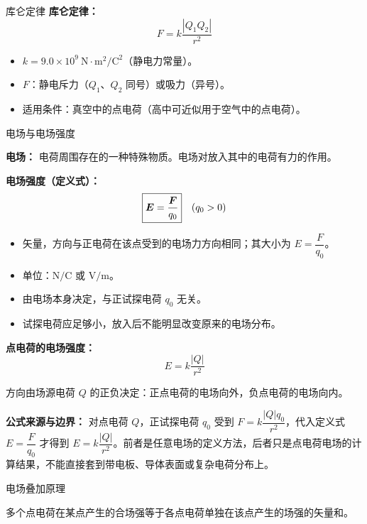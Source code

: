 \begin{conceptbox}{库仑定律}
\textbf{库仑定律：}
\[
\boxed{F = k\frac{|Q_1 Q_2|}{r^2}}
\]

\begin{itemize}
  \item $k = 9.0 \times 10^9\ \mathrm{N \cdot m^2 / C^2}$（静电力常量）。
  \item $F$：静电斥力（$Q_1$、$Q_2$ 同号）或吸力（异号）。
  \item 适用条件：真空中的点电荷（高中可近似用于空气中的点电荷）。
\end{itemize}

\begin{center}


\label{fig:coulomb-law}
\end{center}

\end{conceptbox}

\begin{conceptbox}{电场与电场强度}

\textbf{电场：} 电荷周围存在的一种特殊物质。电场对放入其中的电荷有力的作用。

\textbf{电场强度（定义式）：}
\[
\boxed{\boldsymbol{E} = \frac{\boldsymbol{F}}{q_0}}\quad(q_0>0)
\]

\begin{itemize}
  \item 矢量，方向与正电荷在该点受到的电场力方向相同；其大小为 $E=\dfrac{F}{q_0}$。
  \item 单位：$\mathrm{N/C}$ 或 $\mathrm{V/m}$。
  \item 由电场本身决定，与正试探电荷 $q_0$ 无关。
  \item 试探电荷应足够小，放入后不能明显改变原来的电场分布。
\end{itemize}

\textbf{点电荷的电场强度：}
\[
E = k\frac{|Q|}{r^2}
\]

方向由场源电荷 $Q$ 的正负决定：正点电荷的电场向外，负点电荷的电场向内。

\textbf{公式来源与边界：} 对点电荷 $Q$，正试探电荷 $q_0$ 受到 $F=k\dfrac{|Q|q_0}{r^2}$，代入定义式 $E=\dfrac{F}{q_0}$ 才得到 $E=k\dfrac{|Q|}{r^2}$。前者是任意电场的定义方法，后者只是点电荷电场的计算结果，不能直接套到带电板、导体表面或复杂电荷分布上。

\end{conceptbox}

\begin{conceptbox}{电场叠加原理}

多个点电荷在某点产生的合场强等于各点电荷单独在该点产生的场强的矢量和。

\begin{center}


\label{fig:electric-superposition}
\end{center}

\end{conceptbox}

